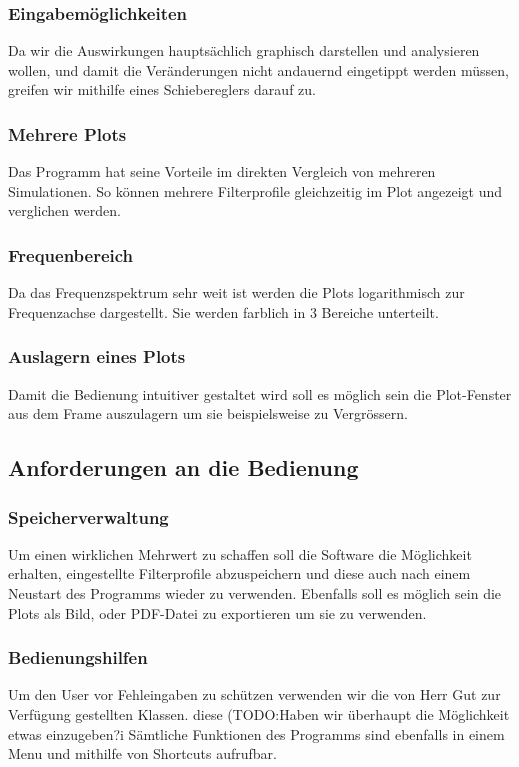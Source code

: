 \subsubsection{Eingabemöglichkeiten}\label{subsubsec:eingabemöglichkeiten}
Da wir  die Auswirkungen hauptsächlich graphisch darstellen und analysieren wollen, und damit die Veränderungen nicht andauernd eingetippt werden müssen, greifen wir mithilfe eines Schiebereglers darauf zu.
\bigskip
\subsubsection{Mehrere Plots}\label{subsubsec:mehrereplots}
Das Programm hat seine Vorteile im direkten Vergleich von mehreren Simulationen. So können mehrere Filterprofile gleichzeitig im Plot angezeigt und verglichen werden.
\bigskip
\subsubsection{Frequenbereich}\label{subsubsec:frequenzbereich}
Da das Frequenzspektrum sehr weit ist werden die Plots logarithmisch zur Frequenzachse dargestellt. Sie werden farblich in 3 Bereiche unterteilt.
\bigskip
\subsubsection{Auslagern eines Plots}\label{subsubsec:auslagerneinesplots}
Damit die Bedienung intuitiver gestaltet wird soll es möglich sein die Plot-Fenster aus dem Frame auszulagern um sie beispielsweise zu Vergrössern. 
		

\subsection{Anforderungen an die Bedienung} \label{subsec:bedienungsanforderungen}

\bigskip
\subsubsection{Speicherverwaltung}  \label{subsubsec:speicherverwaltung}
Um einen wirklichen Mehrwert zu schaffen soll die Software die Möglichkeit erhalten, eingestellte Filterprofile abzuspeichern und diese auch nach einem Neustart des Programms wieder zu verwenden. Ebenfalls soll es möglich sein die Plots als Bild, oder PDF-Datei zu exportieren um sie zu verwenden.
\bigskip
\subsubsection{Bedienungshilfen}\label{subsubsec:bedienungshilfen}
Um den User vor Fehleingaben zu schützen verwenden wir die von Herr Gut zur Verfügung gestellten Klassen. diese (TODO:Haben wir überhaupt die Möglichkeit etwas einzugeben?^^)
Sämtliche Funktionen des Programms sind ebenfalls in einem Menu und mithilfe von Shortcuts aufrufbar.

